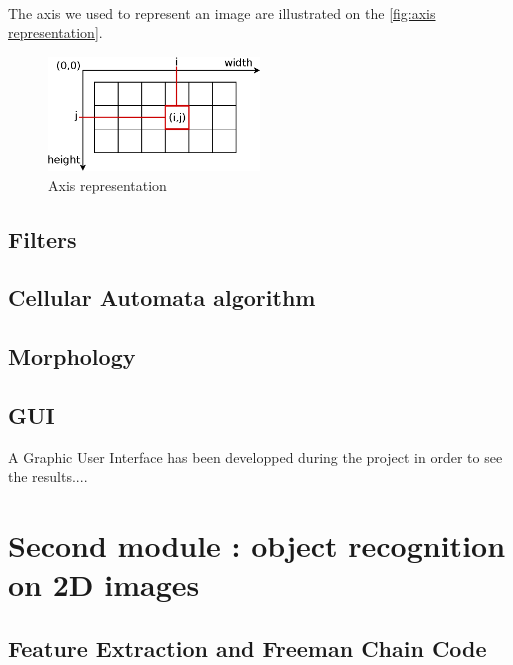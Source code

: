 
~~

The axis we used to represent an image are illustrated on the \vref{fig:axis representation}. 

\begin{figure}[h]
	\centering
	\includegraphics[width=0.5\textwidth]{images/axis/axis_representation}
	\caption{Axis representation}
	\label{fig:axis representation}
\end{figure}






\subsection{Filters}

\subsection{Cellular Automata algorithm}

\subsection{Morphology}



\subsection{GUI}

A Graphic User Interface has been developped during the project in order to see the results.... 







\section{Second module : object recognition on 2D images}




\subsection{Feature Extraction and Freeman Chain Code}



